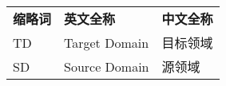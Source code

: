 \documentclass{standalone}
\begin{document}
\begin{thesisabbr}
{
\renewcommand{\arraystretch}{0.7}
\begin{longtable}{p{2.3 cm}@{\hskip 5 pt}p{7.7cm}@{\hskip 5 pt}p{4.2 cm}} 	%
		\textbf{缩略词} & \textbf{英文全称} & \textbf{中文全称}\\
		TD & Target Domain & 目标领域 \\
		SD & Source Domain & 源领域 \\
\end{longtable}
}

\end{thesisabbr}
\end{document}
